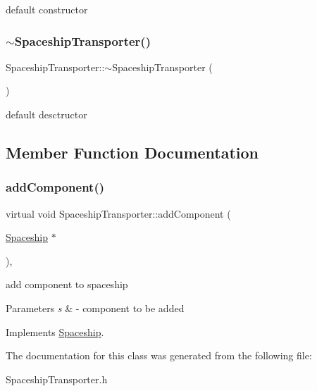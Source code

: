 default constructor \mbox{\label{classSpaceshipTransporter_a58a77ccda8effc3cfdb071c8ffa40929}} 
\subsubsection{\texorpdfstring{$\sim$\+Spaceship\+Transporter()}{~SpaceshipTransporter()}}
{\footnotesize\ttfamily Spaceship\+Transporter\+::$\sim$\+Spaceship\+Transporter (\begin{DoxyParamCaption}{ }\end{DoxyParamCaption})\hspace{0.3cm}{\ttfamily [inline]}}

default desctructor 

\subsection{Member Function Documentation}
\mbox{\label{classSpaceshipTransporter_a3e7646b5937a9967885cd3034a2f5637}} 
\subsubsection{\texorpdfstring{add\+Component()}{addComponent()}}
{\footnotesize\ttfamily virtual void Spaceship\+Transporter\+::add\+Component (\begin{DoxyParamCaption}\item[{\hyperlink{classSpaceship}{Spaceship} $\ast$}]{ }\end{DoxyParamCaption})\hspace{0.3cm}{\ttfamily [inline]}, {\ttfamily [virtual]}}

add component to spaceship 
\begin{DoxyParams}{Parameters}
{\em s} & -\/ component to be added \\
\hline
\end{DoxyParams}


Implements \hyperlink{classSpaceship_ac1b4673a691cd100708ddea08cd9f192}{Spaceship}.



The documentation for this class was generated from the following file\+:\begin{DoxyCompactItemize}
\item 
Spaceship\+Transporter.\+h\end{DoxyCompactItemize}
